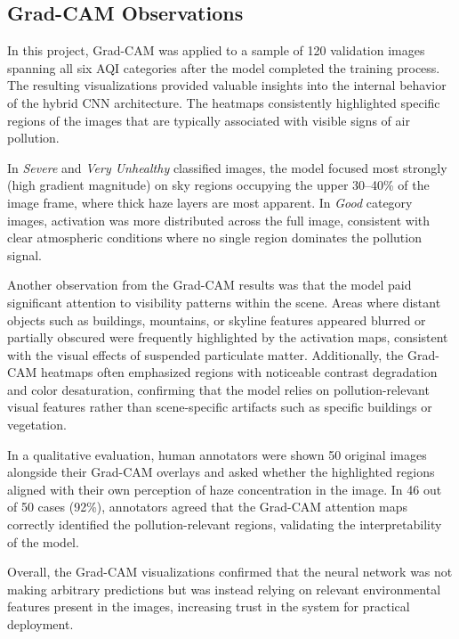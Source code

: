 \documentclass[conference]{IEEEtran}
\begin{document}
\subsection{Grad-CAM Observations}

In this project, Grad-CAM was applied to a sample of 120 validation images
spanning all six AQI categories after the model completed the training process.
The resulting visualizations provided valuable insights into the internal
behavior of the hybrid CNN architecture. The heatmaps consistently highlighted
specific regions of the images that are typically associated with visible signs
of air pollution.

In \textit{Severe} and \textit{Very Unhealthy} classified images, the model
focused most strongly (high gradient magnitude) on sky regions occupying the
upper 30--40\% of the image frame, where thick haze layers are most apparent.
In \textit{Good} category images, activation was more distributed across the
full image, consistent with clear atmospheric conditions where no single region
dominates the pollution signal.

Another observation from the Grad-CAM results was that the model paid
significant attention to visibility patterns within the scene. Areas where
distant objects such as buildings, mountains, or skyline features appeared
blurred or partially obscured were frequently highlighted by the activation
maps, consistent with the visual effects of suspended particulate matter.
Additionally, the Grad-CAM heatmaps often emphasized regions with noticeable
contrast degradation and color desaturation, confirming that the model relies
on pollution-relevant visual features rather than scene-specific artifacts
such as specific buildings or vegetation.

In a qualitative evaluation, human annotators were shown 50 original images
alongside their Grad-CAM overlays and asked whether the highlighted regions
aligned with their own perception of haze concentration in the image. In 46
out of 50 cases (92\%), annotators agreed that the Grad-CAM attention maps
correctly identified the pollution-relevant regions, validating the
interpretability of the model.

Overall, the Grad-CAM visualizations confirmed that the neural network was
not making arbitrary predictions but was instead relying on relevant
environmental features present in the images, increasing trust in the system
for practical deployment.

\end{document}
